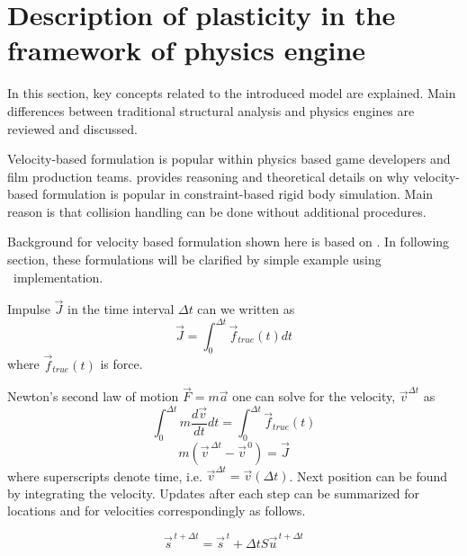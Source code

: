 \section{Description of plasticity in the framework of physics engine}

In this section, key concepts related to the introduced model are explained. Main differences between 
traditional structural analysis and physics engines are reviewed and discussed.

Velocity-based formulation is  popular within physics based game
developers and film production teams.
\citet{erleben.thesis} 
provides reasoning and theoretical details on why 
velocity-based formulation is  popular in constraint-based rigid body simulation. 
Main reason is that collision handling can be done without additional procedures.

Background
for velocity based formulation shown here is based on  
\citet{erleben.thesis}.
In following section, these formulations will be clarified by simple example using \bullet\ implementation.

Impulse $\vec{J}$
in the time interval $\Delta t $ can we written as
\begin{equation} \label{eq:impulseIntegral}
\vec{J} = \int_{0}^{\Delta t} \vec{f}_{true}(t) dt
\end{equation}
where $\vec{f}_{true}(t)$ is force.

Newton's second law of motion $\vec{F}=m\vec{a}$ one can solve for the velocity,
$\vec{v}^{\Delta t}$ as
\begin{equation} \label{eq:impulseIntegraWithNewton}
\int_{0}^{\Delta t} m \frac{d\vec{v}}{dt}dt= \int_{0}^{\Delta t} \vec{f}_{true}(t)
\end{equation}
\begin{equation} \label{eq:impulse}
m(\vec{v}^{\, \Delta t} - \vec{v}^{\, 0})=\vec{J}
\end{equation}
where superscripts denote time, i.e. ${\vec{v}}^{\Delta t}=\vec{v}(\Delta t)$.
Next position can be found
by integrating the velocity.
Updates after each step can be summarized  for locations and  
for velocities correspondingly as follows.

\begin{equation} \label{eq:eomL} %
\vec{s}^{\, t+\Delta t} = \vec{s}^{\, t}+\Delta t S \vec{u}^{\, t+\Delta t}
\end{equation}

